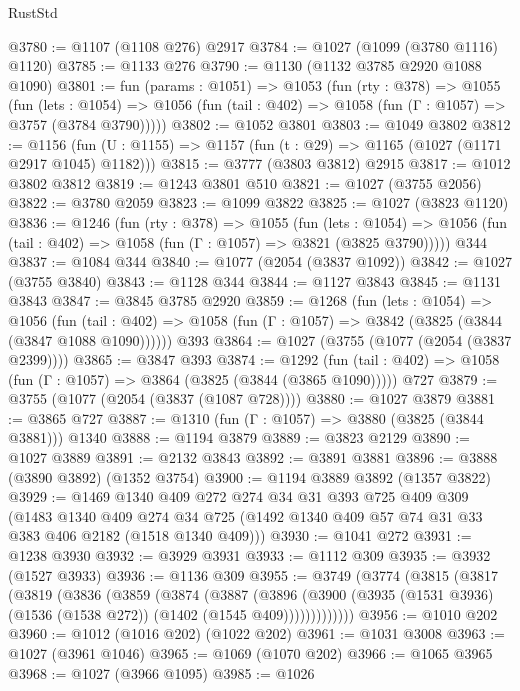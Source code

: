 \begin{lexlean}{RustStd}
\begin{coremodule}
@3780 := @1107 (@1108 @276) @2917
@3784 := @1027 (@1099 (@3780 @1116) @1120)
@3785 := @1133 @276
@3790 := @1130 (@1132 @3785 @2920 @1088 @1090)
@3801 := fun (params : @1051) =>
  @1053
    (fun (rty : @378) =>
    @1055
      (fun (lets : @1054) =>
      @1056 (fun (tail : @402) => @1058 (fun (Γ : @1057) => @3757 (@3784 @3790)))))
@3802 := @1052 @3801
@3803 := @1049 @3802
@3812 := @1156 (fun (U : @1155) => @1157 (fun (t : @29) => @1165 (@1027 (@1171 @2917 @1045) @1182)))
@3815 := @3777 (@3803 @3812) @2915
@3817 := @1012 @3802 @3812
@3819 := @1243 @3801 @510
@3821 := @1027 (@3755 @2056)
@3822 := @3780 @2059
@3823 := @1099 @3822
@3825 := @1027 (@3823 @1120)
@3836 := @1246
    (fun (rty : @378) =>
    @1055
      (fun (lets : @1054) =>
      @1056 (fun (tail : @402) => @1058 (fun (Γ : @1057) => @3821 (@3825 @3790)))))
    @344
@3837 := @1084 @344
@3840 := @1077 (@2054 (@3837 @1092))
@3842 := @1027 (@3755 @3840)
@3843 := @1128 @344
@3844 := @1127 @3843
@3845 := @1131 @3843
@3847 := @3845 @3785 @2920
@3859 := @1268
    (fun (lets : @1054) =>
    @1056
      (fun (tail : @402) => @1058 (fun (Γ : @1057) => @3842 (@3825 (@3844 (@3847 @1088 @1090))))))
    @393
@3864 := @1027 (@3755 (@1077 (@2054 (@3837 @2399))))
@3865 := @3847 @393
@3874 := @1292
    (fun (tail : @402) => @1058 (fun (Γ : @1057) => @3864 (@3825 (@3844 (@3865 @1090)))))
    @727
@3879 := @3755 (@1077 (@2054 (@3837 (@1087 @728))))
@3880 := @1027 @3879
@3881 := @3865 @727
@3887 := @1310 (fun (Γ : @1057) => @3880 (@3825 (@3844 @3881))) @1340
@3888 := @1194 @3879
@3889 := @3823 @2129
@3890 := @1027 @3889
@3891 := @2132 @3843
@3892 := @3891 @3881
@3896 := @3888 (@3890 @3892) (@1352 @3754)
@3900 := @1194 @3889 @3892 (@1357 @3822)
@3929 := @1469
    @1340
    @409
    @272
    @274
    @34
    @31
    @393
    @725
    @409
    @309
    (@1483
      @1340
      @409
      @274
      @34
      @725
      (@1492 @1340 @409 @57 @74 @31 @33 @383 @406 @2182 (@1518 @1340 @409)))
@3930 := @1041 @272
@3931 := @1238 @3930
@3932 := @3929 @3931
@3933 := @1112 @309
@3935 := @3932 (@1527 @3933)
@3936 := @1136 @309
@3955 := @3749
    (@3774
      (@3815
        (@3817
          (@3819
            (@3836
              (@3859
                (@3874
                  (@3887
                    (@3896
                      (@3900
                        (@3935 (@1531 @3936) (@1536 (@1538 @272)) (@1402 (@1545 @409)))))))))))))
@3956 := @1010 @202
@3960 := @1012 (@1016 @202) (@1022 @202)
@3961 := @1031 @3008
@3963 := @1027 (@3961 @1046)
@3965 := @1069 (@1070 @202)
@3966 := @1065 @3965
@3968 := @1027 (@3966 @1095)
@3985 := @1026

\end{coremodule}
\end{lexlean}
